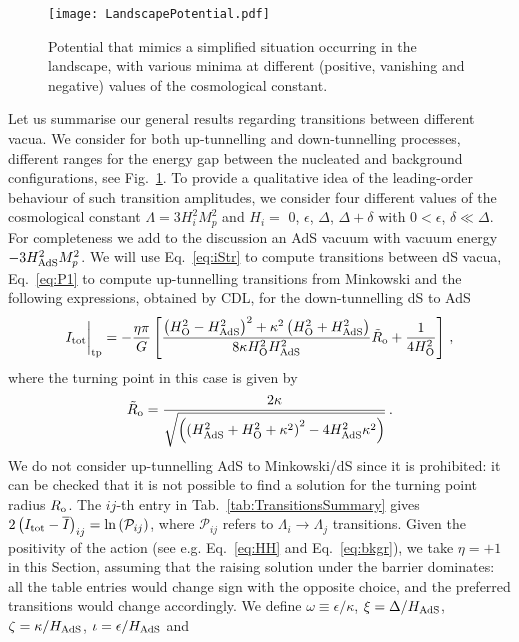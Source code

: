 \documentclass[11pt,a4paper]{article}
\begin{document}
\begin{figure}[h!] 
\begin{center} 
\texttt{[image: LandscapePotential.pdf]}
\caption{\footnotesize{Potential that mimics a simplified situation occurring in the landscape, with various minima at different (positive, vanishing and negative) values of the cosmological constant.\label{fig:LandscapePotential}}}
\end{center} 
\end{figure}
\noindent Let us summarise our general results regarding transitions between different vacua. We consider for both up-tunnelling and down-tunnelling processes, different ranges for the energy gap between the nucleated and background configurations, see Fig.~\ref{fig:LandscapePotential}. To provide a qualitative idea of the leading-order behaviour of such transition amplitudes, we consider four different values of the cosmological constant $\Lambda = 3 H_i^2 M_p^2$ and $H_i = $ 0, $\epsilon$, $\Delta$, $\Delta + \delta$ with $0 < \epsilon$, $\delta \ll \Delta$. For completeness we add to the discussion an AdS vacuum with vacuum energy $- 3 H_{\rm AdS}^2 M_p^2$. We will use Eq.~\eqref{eq:iStr} to compute transitions between dS vacua, Eq.~\eqref{eq:P1} to compute up-tunnelling transitions from Minkowski and the following expressions, obtained by CDL, for the down-tunnelling dS to AdS
\begin{equation}
I_{\rm tot}\bigg|_{\rm tp} = - \frac{\eta \pi}{G} \left[\frac{\left(H_{\rm O}^2 - H_{\rm AdS}^2\right)^2 + \kappa^2 \left(H_{\rm O}^2 + H_{\rm AdS}^2\right)}{8 \kappa H_{\rm O}^2 H_{\rm AdS}^2} \tilde{R}_{\rm o} + \frac{1}{4 H_{\rm O}^2}\right] \,,
\end{equation}
where the turning point in this case is given by
\begin{equation}
\tilde{R}_{\rm o} = \frac{2 \kappa}{\sqrt{\left(\left(H_{\rm AdS}^2 + H_{\rm O}^2 + \kappa^2\right)^2 - 4 H_{\rm AdS}^2 \kappa^2 \right)}} \,.
\end{equation}
We do not consider up-tunnelling AdS to Minkowski/dS since it is prohibited: it can be checked that it is not possible to find a solution for the turning point radius $R_{\rm o}$. The $ij$-th entry in Tab.~\ref{tab:TransitionsSummary} gives $2 \left(I_{\rm tot} - \overline{I}\right)_{ij} = \ln\left(\mathcal{P}_{ij}\right)$, where $\mathcal{P}_{ij}$ refers to $\Lambda_{i}\rightarrow \Lambda_{j}$ transitions. Given the positivity of the action (see e.g. Eq.~\eqref{eq:HH} and Eq.~\eqref{eq:bkgr}), we take $\eta = +1$ in this Section, assuming that the raising solution under the barrier dominates: all the table entries would change sign with the opposite choice, and the preferred transitions would change accordingly. We define $\omega \equiv \epsilon/\kappa$, $\xi = \Delta/H_{\rm AdS}$, $\zeta = \kappa/H_{\rm AdS}$, $\iota = \epsilon/H_{\rm AdS}$ and
\end{document}
